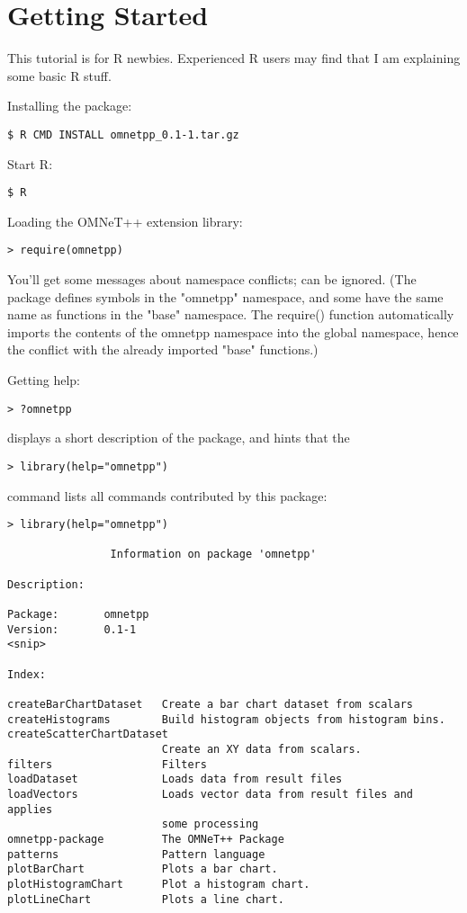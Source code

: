 \section{Getting Started}

This tutorial is for R newbies. Experienced R users may find that I am explaining some basic R stuff.

Installing the package:

\begin{verbatim}
$ R CMD INSTALL omnetpp_0.1-1.tar.gz
\end{verbatim}

Start R:

\begin{verbatim}
$ R
\end{verbatim}

Loading the OMNeT++ extension library:

\begin{verbatim}
> require(omnetpp)
\end{verbatim}

You'll get some messages about namespace conflicts; can be ignored. (The package defines 
symbols in the "omnetpp" namespace, and some have the same name as functions 
in the "base" namespace. The require() function automatically imports the contents 
of the omnetpp namespace into the global namespace, hence the conflict with the 
already imported "base" functions.)

Getting help:

\begin{verbatim}
> ?omnetpp
\end{verbatim}

displays a short description of the package, and hints that the

\begin{verbatim}
> library(help="omnetpp")
\end{verbatim}

command lists all commands contributed by this package:

\begin{verbatim}
> library(help="omnetpp")

                Information on package 'omnetpp'

Description:

Package:       omnetpp
Version:       0.1-1
<snip>

Index:

createBarChartDataset   Create a bar chart dataset from scalars
createHistograms        Build histogram objects from histogram bins.
createScatterChartDataset
                        Create an XY data from scalars.
filters                 Filters
loadDataset             Loads data from result files
loadVectors             Loads vector data from result files and applies
                        some processing
omnetpp-package         The OMNeT++ Package
patterns                Pattern language
plotBarChart            Plots a bar chart.
plotHistogramChart      Plot a histogram chart.
plotLineChart           Plots a line chart.
\end{verbatim}

